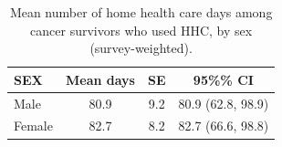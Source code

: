 
\begin{longtable}[t]{lccc}
\caption{\label{tab:tab:days-sex}Mean number of home health care days among cancer survivors who used HHC, by sex (survey-weighted).}\\
\toprule
SEX & Mean days & SE & 95\%\% CI\\
\midrule
Male & 80.9 & 9.2 & 80.9 (62.8, 98.9)\\
Female & 82.7 & 8.2 & 82.7 (66.6, 98.8)\\
\bottomrule
\end{longtable}
